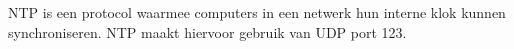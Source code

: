 NTP is een protocol waarmee computers in een netwerk hun interne klok kunnen synchroniseren. NTP maakt hiervoor gebruik van UDP port 123.

